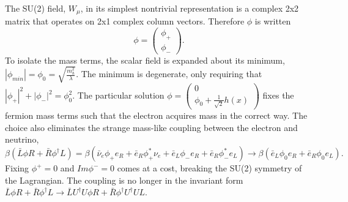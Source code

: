 \documentclass[12pt]{article}
\begin{document}
The SU(2) field, $W_\mu$, in its simplest nontrivial representation is a complex 2x2 matrix that operates on 2x1 complex column vectors. Therefore $\phi$ is written 
\begin{equation}
\phi = 
\begin{pmatrix}
\phi_+ \\ \phi_-
\end{pmatrix}.
\end{equation}
To isolate the mass terms, the scalar field is expanded about its minimum, $|\phi_{min}| = \phi_0 = \sqrt{\frac{m_h^2}{\lambda}}$. The minimum is degenerate, only requiring that $|\phi_+|^{2} + |\phi_-|^{2} = \phi_0^2$. The particular solution $\phi = \begin{pmatrix} 0 \\ \phi_0 + \frac{1}{\sqrt{2}}h(x) \end{pmatrix}$ fixes the fermion mass terms such that the electron acquires mass in the correct way. The choice also eliminates the strange mass-like coupling between the electron and neutrino,
\begin{equation}
\beta(\bar{L}\phi R + \bar{R}\phi^\dagger L) = \beta(\bar{\nu}_e\phi_+e_R + \bar{e}_R\phi_+^{*}\nu_e + \bar{e}_L\phi_-e_R + \bar{e}_R\phi_-^{*}e_L) \rightarrow 
\beta(\bar{e}_L\phi_0e_R + \bar{e}_R\phi_0e_L).
\end{equation}
Fixing $\phi^+=0$ and $Im\phi^-=0$ comes at a cost, breaking the SU(2) symmetry of the Lagrangian. The coupling is no longer in the invariant form $\bar{L}\phi R + \bar{R}\phi^\dagger L \rightarrow \bar{L}U^\dagger U\phi R + \bar{R}\phi^\dagger U^\dagger UL$. 
\end{document}
